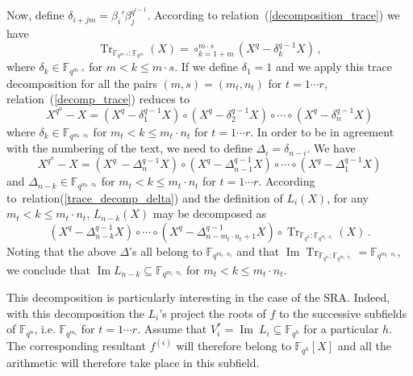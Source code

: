 \documentclass{sig-alternate}
\newcommand{\ff}[1]{\mathbb{F}_{#1}}
\newcommand{\qq}{q}
\newcommand{\nn}{n}
\newcommand{\qn}{{\qq^\nn}}
\newcommand{\extf}{\ff{\qn}}
\DeclareMathOperator{\Tr}{Tr}
\DeclareMathOperator{\Ima}{Im}
\newcommand{\tr}[2]{\Tr_{\ff{#1}:\ff{#2}}}
\begin{document}
Now, define $\delta_{i+jm}=\beta_i' \beta_j^{\qq^{i-1}} $. According to relation~(\ref{decomposition_trace}) we have
\begin{equation}
\label{trace_decomp_delta}
\tr{\qq^{m \cdot s}}{\qq^{m}}(X)=\circ_{k=1+m}^{m \cdot s}  (X^{\qq} -\delta_k^{\qq-1} X ) \,,
\end{equation}
where $\delta_{k} \in \mathbb{F}_{\qq^{m \cdot s}}$ for $m  < k \le m \cdot s$. If we define $\delta_1=1$ and we apply this trace decomposition for all the pairs $(m,s)=(m_{t},n_t)$ for $t=1 \cdots r$, 
relation~(\ref{decomp_trace}) reduces to  
$$X^{\qq^{\nn}}-X=(X^{\qq} -\delta_1^{\qq-1} X ) \circ (X^{\qq} -\delta_2^{\qq-1} X ) \circ \cdots \circ (X^{\qq} -\delta_n^{\qq-1} X )$$
where $\delta_{k} \in \mathbb{F}_{\qq^{m_t \cdot n_t}}$ for $m_{t}  < k \le m_t \cdot n_t$ for $t=1 \cdots r$. In order to be in agreement with the numbering of the text, we need to define $\Delta_i=\delta_{n-i}$.
We have
$$X^{\qq^{\nn}}-X=(X^{\qq.} -\Delta_n^{\qq-1} X ) \circ (X^{\qq} -\Delta_{n-1}^{\qq-1} X ) \circ \cdots \circ (X^{\qq} -\Delta_1^{\qq-1} X )$$
and $\Delta_{n-k} \in \mathbb{F}_{\qq^{m_t \cdot n_t}}$ for $m_{t}  < k \le m_t \cdot n_t$ for $t=1 \cdots r$.
According to~relation(\ref{trace_decomp_delta}) and the definition of $L_i(X)$, for any $m_{t} < k \le  m_t \cdot n_t$, $L_{n-k}(X)$ may be decomposed as
$$(X^q-\Delta_{n-k}^{q-1}X) \circ \cdots \circ (X^q-\Delta_{n-m_t \cdot n_t+1}^{q-1}X) \circ  \tr{\qq^{n}}{\qq^{m_t \cdot n_t}}(X)\,.$$
Noting that the above $\Delta$'s all belong to $\mathbb{F}_{\qq^{m_t \cdot n_t}}$ and that $\Ima \tr{\qq^{n}}{\qq^{m_t \cdot n_t}}=\mathbb{F}_{\qq^{m_t \cdot n_t}}$, we conclude that $\Ima L_{n-k} \subseteq \mathbb{F}_{\qq^{m_t \cdot n_t}}$ for $ m_{t}  < k \le m_{t} \cdot n_t$.


\medskip

 This decomposition is particularly interesting in the case of the SRA. Indeed, with this decomposition the $L_i$'s project the roots of $f$ to the successive subfields of $\extf$, i.e.  $\mathbb{F}_{\qq^{m_t}}$ for $t=1 \cdots r$.
 Assume that $V_i^\ast=\Ima~L_i \subseteq \mathbb{F}_{\qq^h}$ for a particular $h$. The corresponding resultant $f^{(i)}$ will therefore belong to $\mathbb{F}_{\qq^h}[X]$ and all the arithmetic will therefore take place in this subfield.
\end{document}
